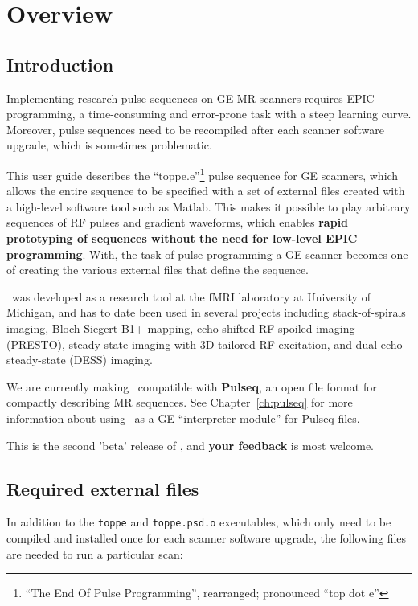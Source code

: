 

\chapter{Overview}
\setcounter{page}{1}

\section{Introduction}
Implementing research pulse sequences on GE MR scanners requires EPIC programming, a time-consuming and error-prone task with a steep learning curve.
Moreover, pulse sequences need to be recompiled after each scanner software upgrade, which is sometimes problematic.

This user guide describes the ``toppe.e''\footnote{``The End Of Pulse Programming'', rearranged; pronounced ``top dot e''} pulse sequence for GE scanners, which allows the entire sequence to be specified with a set of external files created with a high-level software tool such as Matlab.
This makes it possible to play arbitrary sequences of RF pulses and gradient waveforms, which enables \textbf{rapid prototyping of sequences without the need for low-level EPIC programming}.
With\toppe, the task of pulse programming a GE scanner becomes one of creating the various external files that define the sequence.

\toppe~was developed as a research tool at the fMRI laboratory at University of Michigan, and has to date been used in several projects including stack-of-spirals imaging, Bloch-Siegert B1+ mapping, echo-shifted RF-spoiled imaging (PRESTO), steady-state imaging with 3D tailored RF excitation, and dual-echo steady-state (DESS) imaging.

We are currently making \toppe~compatible with {\bf Pulseq}, an open file format for compactly describing MR sequences.
See Chapter~\ref{ch:pulseq} for more information about using \toppe~as a GE ``interpreter module'' for Pulseq files.

This is the second 'beta' release of \toppe, and \textbf{your feedback} is most welcome. 


\section{Required external files}
In addition to the {\tt toppe} and {\tt toppe.psd.o} executables, which only need to be compiled and installed once for each scanner software upgrade, the following files are needed to run a particular scan:

